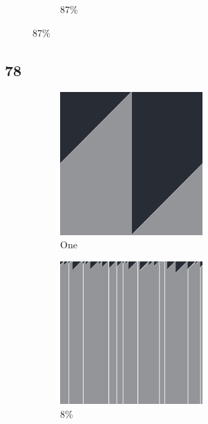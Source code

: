 \documentclass[12pt, fleqn]{report}                             %
\theoremstyle{break}                                            %
\begin{document}
\begin{figure}[ht!]
\begin{subfigure}[b]{0.4\linewidth}
          \caption{87\%}
        \end{subfigure}
      \end{figure}


      \clearpage
      \subsection{78}
      \begin{figure}[ht!]
        \centering
        \begin{subfigure}[b]{0.4\linewidth}
          \includegraphics[width=0.6\textwidth]{Images/78/a.png}
          \caption{One}
        \end{subfigure}
        \begin{subfigure}[b]{0.4\linewidth}
          \includegraphics[width=0.6\textwidth]{Images/78/b.png}
          \caption{8\%}
        \end{subfigure}
        \begin{subfigure}[b]{0.4\linewidth}

\end{subfigure}
\end{figure}
\end{document}
